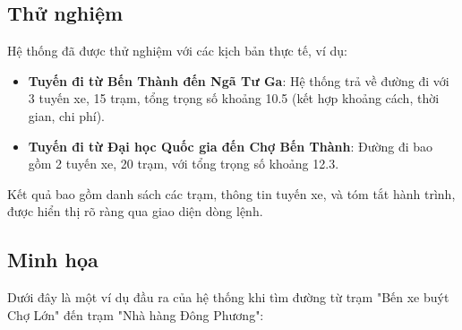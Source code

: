 \documentclass[a4paper,12pt]{article}
\begin{document}
\subsection{Thử nghiệm}
Hệ thống đã được thử nghiệm với các kịch bản thực tế, ví dụ:
\begin{itemize}
    \item \textbf{Tuyến đi từ Bến Thành đến Ngã Tư Ga}: Hệ thống trả về đường đi với 3 tuyến xe, 15 trạm, tổng trọng số khoảng 10.5 (kết hợp khoảng cách, thời gian, chi phí).
    \item \textbf{Tuyến đi từ Đại học Quốc gia đến Chợ Bến Thành}: Đường đi bao gồm 2 tuyến xe, 20 trạm, với tổng trọng số khoảng 12.3.
\end{itemize}
Kết quả bao gồm danh sách các trạm, thông tin tuyến xe, và tóm tắt hành trình, được hiển thị rõ ràng qua giao diện dòng lệnh.

\subsection{Minh họa}

Dưới đây là một ví dụ đầu ra của hệ thống khi tìm đường từ trạm "Bến xe buýt Chợ Lớn" đến trạm "Nhà hàng Đông Phương":
\end{document}
